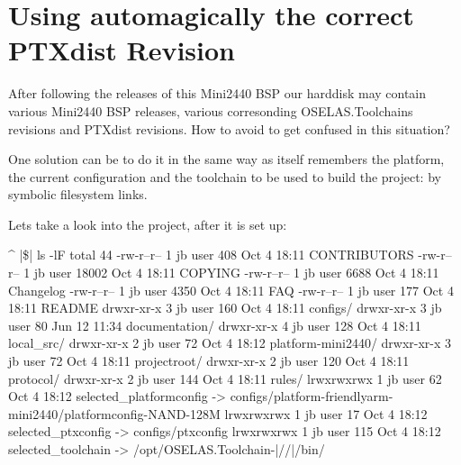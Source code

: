 %
%
%
%
%
%
%

\section{Using automagically the correct PTXdist Revision}	\label{sec:ptxdistreleases}

After following the releases of this Mini2440 BSP our harddisk may contain
various Mini2440 BSP releases, various corresonding OSELAS.Toolchains revisions
and PTXdist revisions. How to avoid to get confused in this situation?

One solution can be to do it in the same way as \ptxdist{} itself remembers the
platform, the current configuration and the toolchain to be used to build the
project: by symbolic filesystem links.

Lets take a look into the project, after it is set up:

\begin{ptxshell}[escapechar=|]{^}
|\$| ls -lF
total 44
-rw-r--r-- 1 jb user   408 Oct  4 18:11 CONTRIBUTORS
-rw-r--r-- 1 jb user 18002 Oct  4 18:11 COPYING
-rw-r--r-- 1 jb user  6688 Oct  4 18:11 Changelog
-rw-r--r-- 1 jb user  4350 Oct  4 18:11 FAQ
-rw-r--r-- 1 jb user   177 Oct  4 18:11 README
drwxr-xr-x 3 jb user   160 Oct  4 18:11 configs/
drwxr-xr-x 3 jb user    80 Jun 12 11:34 documentation/
drwxr-xr-x 4 jb user   128 Oct  4 18:11 local_src/
drwxr-xr-x 2 jb user    72 Oct  4 18:12 platform-mini2440/
drwxr-xr-x 3 jb user    72 Oct  4 18:11 projectroot/
drwxr-xr-x 2 jb user   120 Oct  4 18:11 protocol/
drwxr-xr-x 2 jb user   144 Oct  4 18:11 rules/
lrwxrwxrwx 1 jb user    62 Oct  4 18:12 selected_platformconfig -> configs/platform-friendlyarm-mini2440/platformconfig-NAND-128M
lrwxrwxrwx 1 jb user    17 Oct  4 18:12 selected_ptxconfig -> configs/ptxconfig
lrwxrwxrwx 1 jb user   115 Oct  4 18:12 selected_toolchain -> /opt/OSELAS.Toolchain-|\oselasTCNVendorVersion \oselasTCNPatchLevel /\ptxdistCompilerName /\ptxdistCompilerVersion |/bin/
\end{ptxshell}

